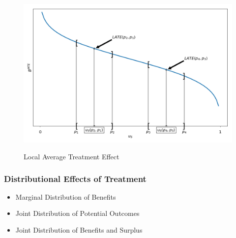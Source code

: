  
\begin{frame}

\begin{figure}[htp]\centering
	\caption{Local Average Treatment Effect}\label{Local Average Treatment}\scalebox{0.35}
	{\includegraphics{./material/fig-local-average-treatment.png}}
\end{figure}

\end{frame} 
 
 
\begin{frame}  
\frametitle{Distributional Effects of Treatment}

\begin{itemize}
\item
  Marginal Distribution of Benefits
\item
  Joint Distribution of Potential Outcomes
\item
  Joint Distribution of Benefits and Surplus
\end{itemize}
\end{frame}


